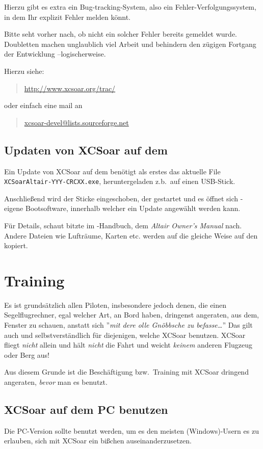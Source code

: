Hierzu gibt es extra ein Bug-tracking-System, also ein Fehler-Verfolgungssystem, in dem Ihr explizit Fehler melden könnt.

Bitte seht vorher nach, ob nicht ein solcher Fehler bereits gemeldet wurde. 
Doubletten machen unglaublich viel Arbeit und behindern den zügigen Fortgang der Entwicklung --logischerweise.  


Hierzu siehe:  
\begin{quote}
\url{http://www.xcsoar.org/trac/}
\end{quote}
oder einfach eine mail an 
\begin{quote}
\url{xcsoar-devel@lists.sourceforge.net}
\end{quote} 

\subsection*{Updaten von \textsf{XCSoar} auf dem \al}

Ein Update von \textsf{XCSoar} auf dem \al  benötigt als erstes das aktuelle  File {\tt XCSoarAltair-YYY-CRCXX.exe}, 
heruntergeladen z.b.\ auf einen USB-Stick. 

Anschließend wird der Sticke eingeschoben, der \al gestartet und es öffnet sich \al-eigene Bootsoftware, 
innerhalb welcher ein Update angewählt werden kann.

Für Details, schaut bitzte im \al-Handbuch, dem {\em Altair Owner's Manual} nach.
Andere Dateien wie Lufträume, Karten etc. werden auf die gleiche Weise auf den \al kopiert. 

\section{Training}
Es ist grundsätzlich allen Piloten,  insbesondere jedoch denen, die einen Segelflugrechner,  egal welcher Art, an Bord haben, 
dringenst angeraten, aus dem, Fenster zu schauen, anstatt sich ''{\it mit dere olle Gnöbbsche zu befasse\dots}''
\achtung 
Das gilt auch und selbstverständlich für diejenigen, welche \textsf{XCSoar} benutzen. \textsf{XCSoar} fliegt {\sl nicht} allein und hält {\sl nicht} 
die Fahrt und weicht {\sl keinem}  anderen Flugzeug oder Berg aus! 

Aus diesem Grunde ist die Beschäftigung bzw.\ Training mit \textsf{XCSoar} dringend angeraten, {\sl bevor} man es benutzt. 


\subsection*{\textsf{XCSoar} auf dem PC benutzen}
Die PC-Version sollte benutzt werden, um es den meisten (Windows)-Usern es zu erlauben, sich mit \textsf{XCSoar} ein 
bißchen auseinanderzusetzen. 

